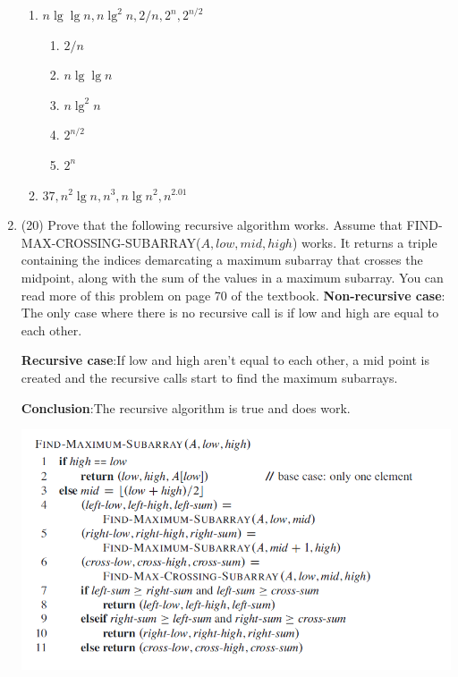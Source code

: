 \documentclass[12pt]{article}
\begin{document}
\begin{enumerate}
\begin{enumerate}
\item
$n\lg\lg n, n\lg^2 n, 2/n, 2^n, 2^{n/2}$
\begin{enumerate}
\item $2/n$
\item $n\lg\lg n$
\item $n\lg^2 n$
\item $2^{n/2}$
\item $2^n$
\end{enumerate}

\item
$ 37, n^2\lg n, n^3, n \lg n^2, n^{2.01}$
\begin{enumerate}
\item $n\lg n^2$
\item $n^2\lg n$
\item $n^2$
\item $n^{2.01)$
\item $n^3$
\end{enumerate}

\end{enumerate}

\item (20) Prove that the following recursive algorithm works.
Assume that FIND-MAX-CROSSING-SUBARRAY($A, low, mid, high$) works. It returns a triple 
containing the indices demarcating a maximum subarray that crosses the midpoint, along with the 
sum of the values in a maximum subarray. You can read more of this problem on page 70 of the 
textbook.\newline
\textbf{Non-recursive case}: The only case where there is no recursive call is if low and high are equal to each other.
\vspace{30px}
\newline

\textbf{Recursive case}:If low and high aren't equal to each other, a mid point is created and the recursive calls start to find the maximum subarrays.\vspace{30px}
\newline

\textbf{Conclusion}:The recursive algorithm is true and does work.\vspace{30px}


\includegraphics[width=1.0\textwidth]{maxsubarray.png}



\end{enumerate}
\end{document}
